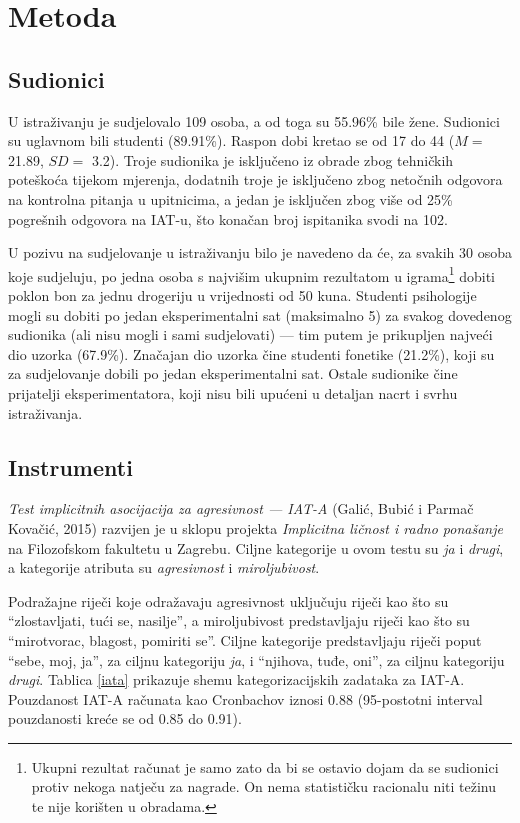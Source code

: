 \documentclass[a4paper, 12pt]{report}
\begin{document}
\section{Metoda}

\subsection{Sudionici}
U istraživanju je sudjelovalo 109 osoba, a od toga su 55.96\% bile žene.
Sudionici su uglavnom bili studenti (89.91\%). Raspon dobi kretao se od 17 do
44 ($M =$ 21.89, $SD =$ 3.2). Troje sudionika je isključeno iz obrade zbog
tehničkih poteškoća tijekom mjerenja, dodatnih troje je isključeno zbog
netočnih odgovora na kontrolna pitanja u upitnicima, a jedan je isključen zbog
više od 25\% pogrešnih odgovora na IAT-u, što konačan broj ispitanika svodi na
102.

U pozivu na sudjelovanje u istraživanju bilo je navedeno da će, za svakih 30
osoba koje sudjeluju, po jedna osoba s najvišim ukupnim rezultatom u igrama\footnote{Ukupni
 rezultat računat je samo zato da bi se ostavio dojam da se
    sudionici protiv nekoga natječu za nagrade. On nema statističku racionalu
    niti težinu te nije korišten u obradama.}
dobiti poklon bon za jednu drogeriju u vrijednosti od 50 kuna.
Studenti psihologije mogli su
dobiti po jedan eksperimentalni sat (maksimalno 5) za svakog dovedenog
sudionika (ali nisu mogli i sami sudjelovati) --- tim putem je prikupljen
najveći dio uzorka (67.9\%). Značajan dio uzorka
čine studenti fonetike (21.2\%), koji su za sudjelovanje dobili po jedan
eksperimentalni sat. Ostale sudionike čine prijatelji eksperimentatora, koji
nisu bili upućeni u detaljan nacrt i svrhu istraživanja. 

\subsection{Instrumenti}

\emph{Test implicitnih asocijacija za agresivnost --- IAT-A} (Galić, Bubić i
    Parmač Kovačić, 2015)
razvijen je u sklopu projekta
\emph{Implicitna ličnost i radno ponašanje} na Filozofskom fakultetu u Zagrebu.
Ciljne kategorije u ovom testu su \emph{ja} i \emph{drugi}, a kategorije
atributa su \emph{agresivnost} i \emph{miroljubivost}. 

Podražajne riječi koje odražavaju agresivnost uključuju riječi kao što su
\enquote{zlostavljati, tući se, nasilje}, a miroljubivost predstavljaju
riječi kao što su \enquote{mirotvorac,
    blagost, pomiriti se}.
Ciljne kategorije predstavljaju riječi poput \enquote{sebe, moj, ja}, za ciljnu
kategoriju \emph{ja}, i \enquote{njihova, tuđe, oni}, za ciljnu kategoriju
\emph{drugi}. Tablica \ref{iata} prikazuje shemu kategorizacijskih zadataka
za IAT-A. Pouzdanost IAT-A računata kao Cronbachov {\textalpha} iznosi 0.88
(95-postotni interval pouzdanosti kreće se od 0.85 do 0.91).
\end{document}
